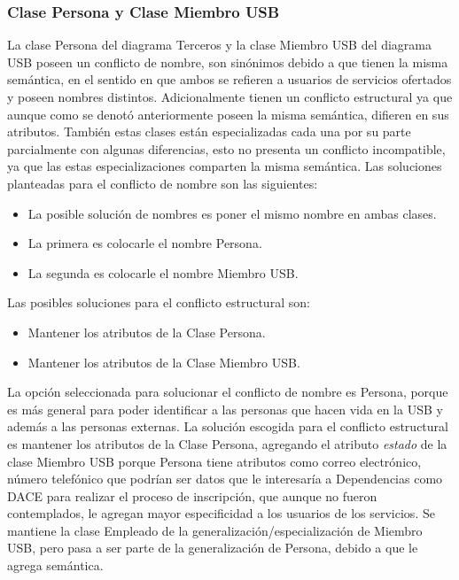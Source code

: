 \documentclass[12pt,a4paper,spanish]{article}
\begin{document}
\subsubsection{Clase Persona y Clase Miembro USB}
\indent La clase Persona del diagrama Terceros y la clase Miembro USB del diagrama USB poseen un conflicto de nombre, son sin\'onimos debido a que tienen la misma sem\'antica, en el sentido en que ambos se refieren a usuarios de servicios ofertados y poseen nombres distintos. Adicionalmente tienen un conflicto estructural ya que aunque como se denot\'o anteriormente poseen la misma sem\'antica, difieren en sus atributos. Tambi\'en estas clases est\'an especializadas cada una por su parte parcialmente con algunas diferencias, esto no presenta un conflicto incompatible, ya que las estas especializaciones comparten la misma sem\'antica.
\newline
\newline
\indent Las soluciones planteadas para el conflicto de nombre son las siguientes:
\begin{itemize}
\item La posible soluci\'on de nombres es poner el mismo nombre en ambas clases. 
\item La primera es colocarle el nombre Persona.
\item La segunda es colocarle el nombre Miembro USB.
\end{itemize}
\indent Las posibles soluciones para el conflicto estructural son:
\begin{itemize}
\item Mantener los atributos de la Clase Persona.
\item Mantener los atributos de la Clase Miembro USB.
\end{itemize}
\indent La opci\'on seleccionada para solucionar el conflicto de nombre es Persona, porque es m\'as general para poder identificar a las personas que hacen vida en la USB y adem\'as a las personas externas.
\newline
\newline
\indent La soluci\'on escogida para el conflicto estructural es mantener los atributos de la Clase Persona, agregando el atributo \emph{estado} de la clase Miembro USB porque Persona tiene atributos como correo electr\'onico, n\'umero telef\'onico que podr\'ian ser datos que le interesar\'ia a Dependencias como DACE para realizar el proceso de inscripci\'on, que aunque no fueron contemplados, le agregan mayor especificidad a los usuarios de los servicios.
\newline
\newline
\indent Se mantiene la clase Empleado de la generalizaci\'on/especializaci\'on de Miembro USB, pero pasa a ser parte de la generalizaci\'on de Persona, debido a que le agrega sem\'antica.
\end{document}
